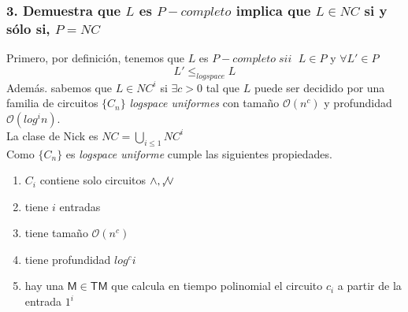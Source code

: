 \documentclass[12pt]{article}
\begin{document}
\subsubsection*{3. Demuestra que $L$ es $P-completo$ implica que $L \in NC$ si y sólo si, $P=NC$ }
Primero, por definición, tenemos que $L$ es $P-completo \; sii \;$ $L \in P$ y $\forall L' \in P$ \[ L' \leq_{logspace} L \]
Además. sabemos que $L \in NC^i$ si $\exists c > 0$ tal que $L$ puede ser decidido por una familia de circuitos $\{C_n\}$ \textit{logspace uniformes} con tamaño $\mathcal{O}(n^c)$ y profundidad $\mathcal{O}(log^in)$.\\
La clase de Nick es $NC = \displaystyle\bigcup_{i \leq 1} NC^i$ \\
Como $\{C_n\}$ es \textit{logspace uniforme} cumple las siguientes propiedades.
\begin{enumerate}
\item $C_i$ contiene solo circuitos $\land, \not, \lor$
\item tiene $i$ entradas
\item tiene tamaño $\mathcal{O}(n^c)$
\item tiene profundidad $log^ci$
\item hay una $\mathsf{M \in TM}$ que calcula en tiempo polinomial el circuito $c_i$ a partir de la entrada $1^i$
\end{enumerate}
\end{document}
